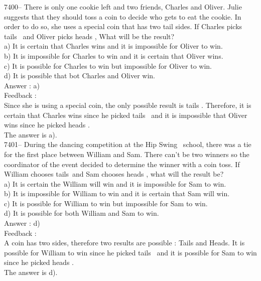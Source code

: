 \documentclass[letterpaper, 12pt]{article}
\begin{document}
7400-- There is only one cookie left and two friends, Charles and Oliver. Julie suggests that they should toss a coin to decide who gets to eat the cookie. In order to do so, she uses a special coin that has two tail sides. If Charles picks \og tails \fg \ and Oliver picks \og heads \fg, What will be the result?\\

a) It is certain that Charles wins and it is impossible for Oliver to win.\\
b) It is impossible for Charles to win and it is certain that Oliver wins.\\
c) It is possible for Charles to win but impossible for Oliver to win.\\
d) It is possible that bot Charles and Oliver win.\\

Answer : a)\\

Feedback :\\
Since she is using a special coin, the only possible result is \og tails \fg. Therefore, it is certain that Charles wins since he picked \og tails \fg \ and it is impossible that Oliver wins since he picked \og heads \fg. \\
The answer is a).\\


7401-- During the dancing competition at the \og Hip Swing \fg \ school, there was a tie for the first place between William and Sam. There can't be two winners so the coordinator of the event decided to determine the winner with a coin toss. If William chooses  \og tails\fg \ and Sam chooses \og heads \fg, what will the result be?\\

a) It is certain the William will win and it is impossible for Sam to win.\\
b) It is impossible for William to win and it is certain that Sam will win.\\
c) It is possible for William to win but impossible for Sam to win.\\
d) It is possible for both William and Sam to win.\\

Answer : d)\\

Feedback :\\
A coin has two sides, therefore two results are \mbox{possible} : Tails and Heads.
It is possible for William to win since he picked \og tails \fg \ and it is possible for Sam to win since he picked \og heads \fg.\\
The answer is d).\\
\end{document}
